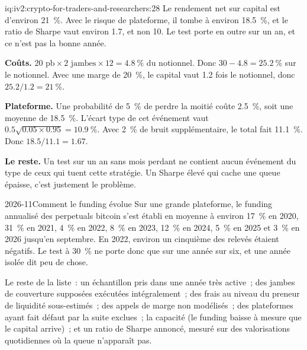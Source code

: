 \begin{solution}{iq:iv2:crypto-for-traders-and-researchers:28}
Le rendement net sur capital est d'environ 21~\%. Avec le risque de plateforme, il tombe à environ 18.5~\%, et le ratio de Sharpe vaut environ 1.7, et non 10. Le test porte en outre sur un an, et ce n'est pas la bonne année.

\textbf{Coûts.} $20 \text{ pb} \times 2 \text{ jambes} \times 12 = 4.8~\%$ du notionnel. Donc $30 - 4.8 = 25.2~\%$ sur le notionnel. Avec une marge de 20~\%, le capital vaut 1.2 fois le notionnel, donc $25.2/1.2 = 21~\%$.

\textbf{Plateforme.} Une probabilité de 5~\% de perdre la moitié coûte 2.5~\%, soit une moyenne de 18.5~\%. L'écart type de cet événement vaut $0.5\sqrt{0.05 \times 0.95} = 10.9~\%$. Avec 2~\% de bruit supplémentaire, le total fait 11.1~\%. Donc $18.5/11.1 = 1.67$.

\textbf{Le reste.} Un test sur un an sans mois perdant ne contient aucun événement du type de ceux qui tuent cette stratégie. Un Sharpe élevé qui cache une queue épaisse, c'est justement le problème.

\begin{dated}{2026-11}{Comment le funding évolue}\label{dat:iv2:crypto-for-traders-and-researchers:hist}
Sur une grande plateforme, le funding annualisé des perpetuals bitcoin s'est établi en moyenne à environ 17~\% en 2020, 31~\% en 2021, 4~\% en 2022, 8~\% en 2023, 12~\% en 2024, 5~\% en 2025 et 3~\% en 2026 jusqu'en septembre. En 2022, environ un cinquième des relevés étaient négatifs. Le test à 30~\% ne porte donc que sur une année sur six, et une année isolée dit peu de chose.
\end{dated}

Le reste de la liste~: un échantillon pris dans une année très active~; des jambes de couverture supposées exécutées intégralement~; des frais au niveau du preneur de liquidité sous-estimés~; des appels de marge non modélisés~; des plateformes ayant fait défaut par la suite exclues~; la capacité (le funding baisse à mesure que le capital arrive)~; et un ratio de Sharpe annoncé, mesuré sur des valorisations quotidiennes où la queue n'apparaît pas.

\end{solution}

